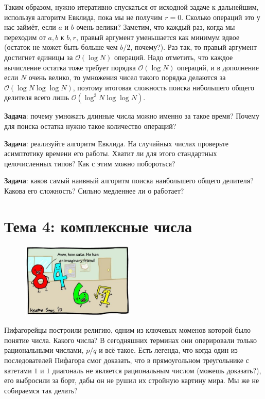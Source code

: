 \documentclass[12pt]{article}
\begin{document}
Таким образом, нужно итеративно спускаться от исходной задаче к дальнейшим, используя алгоритм Евклида, пока мы не получим $r = 0$. Сколько операций это у нас займёт, если $a$ и $b$ очень велики? Заметим, что каждый раз, когда мы переходим от $a, b$ к $b, r$, правый аргумент уменьшается как минимум вдвое (остаток не может быть больше чем $b / 2$, почему?). Раз так, то правый аргумент достигнет единицы за $\mathcal{O}(\log N)$ операций. Надо отметить, что каждое вычисление остатка тоже требует порядка $\mathcal{O}(\log N)$ операций, и в дополнение если $N$ очень велико, то умножения чисел такого порядка делаются за $\mathcal{O}(\log N \log \log N)$, поэтому итоговая сложность поиска нибольшего общего делителя всего лишь $\mathcal{O}(\log^3 N \log \log N)$.

{\bf Задача}: почему умножать длинные числа можно именно за такое время? Почему для поиска остатка нужно такое количество операций?

{\bf Задача}: реализуйте алгоритм Евклида. На случайных числах проверьте асимптотику времени его работы. Хватит ли для этого стандартных целочисленных типов? Как с этим можно побороться? 

{\bf Задача}: каков самый наивный алгоритм поиска наибольшего общего делителя? Какова его сложность? Сильно медленнее ли о работает?

\section*{Тема 4: комплексные числа}
\begin{figure}
  \begin{center}
    \includegraphics[width=0.48\textwidth]{complexjoke.jpg}
  \end{center}
\end{figure}
Пифагорейцы построили религию, одним из ключевых моменов которой было понятие числа. Какого числа? В сегодняшних терминах они оперировали только рациональными числами, $p / q$ и всё такое. Есть легенда, что когда один из последователей Пифагора смог доказать, что в прямоугольном треугольнике с катетами $1$ и $1$ диагональ не является рациональным числом (можешь доказать?), его выбросили за борт, дабы он не рушил их стройную картину мира. Мы же не собираемся так делать?
\end{document}

